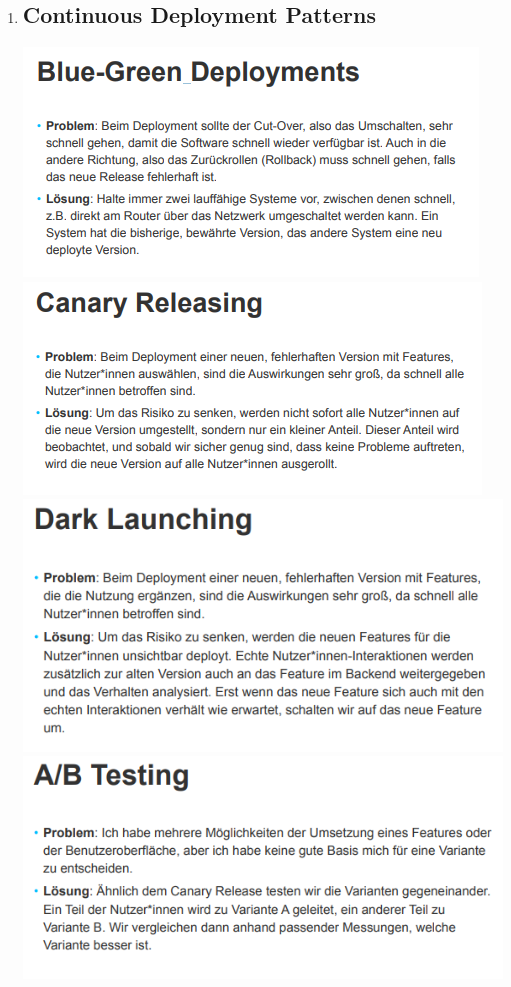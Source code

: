 \documentclass{article}
\begin{document}
\begin{enumerate}[label=\alph*)]
 \item \subsection*{Continuous Deployment Patterns}
	\includegraphics[scale=1.3]{media/blueGreenDep.png}\\
	\includegraphics[scale=1.3]{media/canaryReleasing.png}\\
	\includegraphics[scale=1.1]{media/darkLaunching.png}\\
	\includegraphics[scale=1.1]{media/A_B-Tests.png}\\

\end{enumerate}
\end{document}
